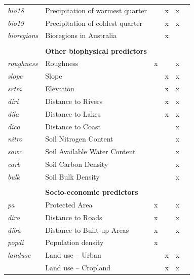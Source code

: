 \documentclass[titlesmallcaps,copyrightpage]{uomthesis}\usepackage[]{graphicx}\usepackage[]{color}
\begin{document}
\begin{table}[htb]
\begin{tabularx}{\textwidth}{lllllY}
\textit{bio18} & Precipitation of warmest quarter &  & x & x &  \\
\textit{bio19} & Precipitation of coldest quarter &  & x & x &  \\
\textit{bioregions} & Bioregions in Australia &  & x &  & \citep{ciesn_global_2011} \\
\textit{} &  &  &  &  &  \\
\textit{\textbf{}} & \textbf{Other biophysical predictors} &  &  &  &  \\
\textit{roughness} & Roughness & x &  & x & \citep{nasa_shuttle_2013} \\
\textit{slope} & Slope &  & x & x & \citep{nasa_shuttle_2013} \\
\textit{srtm} & Elevation &  & x & x & \citep{nasa_shuttle_2013} \\
\textit{diri} & Distance to Rivers &  & x & x & \citep{wessel_global_1996} \\
\textit{dila} & Distance to Lakes &  & x & x & \citep{wessel_global_1996} \\
\textit{dico} & Distance to Coast &  &  & x & \citep{wessel_global_1996} \\
\textit{nitro} & Soil Nitrogen Content &  &  & x & \citep{global_soil_data_task_group_global_2000} \\
\textit{sawc} & Soil Available Water Content &  &  & x & \citep{global_soil_data_task_group_global_2000} \\
\textit{carb} & Soil Carbon Density &  &  & x & \citep{global_soil_data_task_group_global_2000} \\
\textit{bulk} & Soil Bulk Density &  &  & x & \citep{global_soil_data_task_group_global_2000} \\
\textit{} &  &  &  &  &  \\
\textit{\textbf{}} & \textbf{Socio-economic predictors} &  &  &  &  \\
\textit{pa} & Protected Area & x &  & x & \citep{iucn_world_2014} \\
\textit{diro} & Distance to Roads & x &  & x & \citep{ciesn_global_2013} \\
\textit{dibu} & Distance to Built-up Areas & x &  & x & \citep{fao_built-up_1997} \\
\textit{popdi} & Population density & x &  &  & \citep{ciesn_global_2011} \\
\textit{landuse} & Land use – Urban &  & x & x & \citep{european_union_copernicus_2019} \\
 & Land use – Cropland &  & x & x &  \\

\end{tabularx}
\end{table}
\end{document}
